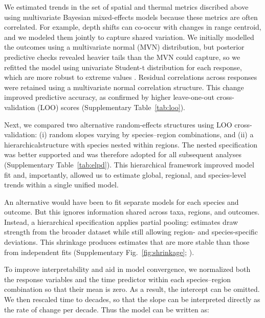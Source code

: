 \documentclass[11pt]{article}
\begin{document}
\begin{spacing}{1.5}
We estimated trends in the set of spatial and thermal metrics discribed above using multivariate Bayesian mixed-effects models because these metrics are often correlated. For example, depth shifts can co-occur with changes in range centroid, and we modeled them jointly to capture shared variation. We initially modelled the outcomes using a multivariate normal (MVN) distribution, but posterior predictive checks revealed heavier tails than the MVN could capture, so we refitted the model using univariate Student-t distribution for each response, which are more robust to extreme values \citep[e.g.,][]{anderson_black-swan_2017}. Residual correlations across responses were retained using a multivariate normal correlation structure. This change improved predictive accuracy, as confirmed by higher leave-one-out cross-validation (LOO) scores \citep{vehtari_practical_2017} (Supplementary Table~\ref{tab:loo}).

Next, we compared two alternative random-effects structures using LOO cross-validation: (i) random slopes varying by species–region combinations, and (ii) a hierarchicalstructure with species nested within regions. The nested specification was better supported and was therefore adopted for all subsequent analyses (Supplementary Table~\ref{tab:elpd}). This hierarchical framework improved model fit and, importantly, allowed us to estimate global, regional, and species-level trends within a single unified model.

An alternative would have been to fit separate models for each species and outcome. But this ignores information shared across taxa, regions, and outcomes. Instead, a hierarchical specification applies partial pooling: estimates draw strength from the broader dataset while still allowing region- and species-specific deviations. This shrinkage produces estimates that are more stable than those from independent fits (Supplementary Fig.~\ref{fig:shrinkage}; \citealt{mcelreath_statistical_2018}).


To improve interpretability and aid in model convergence, we normalized both the response variables and the time predictor within each species–region combination so that their mean is zero. As a result, the intercept can be omitted. We then rescaled time to decades, so that the slope can be interpreted directly as the rate of change per decade.
Thus the model can be written as:


\end{spacing}
\end{document}
